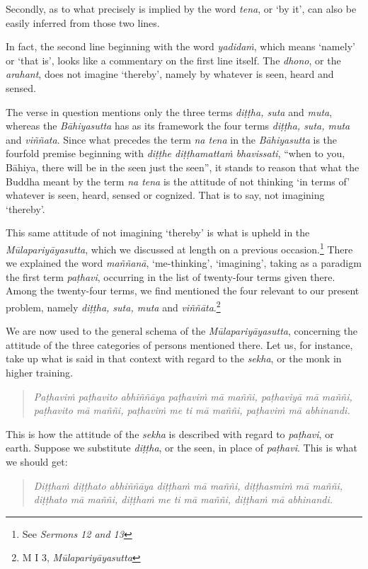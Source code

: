 Secondly, as to what precisely is implied by the word \emph{tena}, or `by it', can also be easily inferred from those two lines.

In fact, the second line beginning with the word \emph{yadidaṁ}, which means `namely' or `that is', looks like a commentary on the first line itself. The \emph{dhono}, or the \emph{arahant}, does not imagine `thereby', namely by whatever is seen, heard and sensed.

The verse in question mentions only the three terms \emph{diṭṭha, suta} and \emph{muta}, whereas the \emph{Bāhiyasutta} has as its framework the four terms \emph{diṭṭha, suta, muta} and \emph{viññata}. Since what precedes the term \emph{na tena} in the \emph{Bāhiyasutta} is the fourfold premise beginning with \emph{diṭṭhe diṭṭhamattaṁ bhavissati}, ``when to you, Bāhiya, there will be in the seen just the seen'', it stands to reason that what the Buddha meant by the term \emph{na tena} is the attitude of not thinking `in terms of' whatever is seen, heard, sensed or cognized. That is to say, not imagining `thereby'.

This same attitude of not imagining `thereby' is what is upheld in the \emph{Mūlapariyāyasutta}, which we discussed at length on a previous occasion.\footnote{See \emph{Sermons 12 and 13}} There we explained the word \emph{maññanā}, `me-thinking', `imagining', taking as a paradigm the first term \emph{paṭhavi}, occurring in the list of twenty-four terms given there. Among the twenty-four terms, we find mentioned the four relevant to our present problem, namely \emph{diṭṭha, suta, muta} and \emph{viññāta}.\footnote{M I 3, \emph{Mūlapariyāyasutta}}

We are now used to the general schema of the \emph{Mūlapariyāyasutta}, concerning the attitude of the three categories of persons mentioned there. Let us, for instance, take up what is said in that context with regard to the \emph{sekha}, or the monk in higher training.

\begin{quote}
\emph{Paṭhaviṁ paṭhavito abhiññāya paṭhaviṁ mā maññi, paṭhaviyā mā maññi, paṭhavito mā maññi, paṭhaviṁ me ti mā maññi, paṭhaviṁ mā abhinandi.}
\end{quote}

This is how the attitude of the \emph{sekha} is described with regard to \emph{paṭhavi}, or earth. Suppose we substitute \emph{diṭṭha}, or the seen, in place of \emph{paṭhavi}. This is what we should get:

\begin{quote}
\emph{Diṭṭhaṁ diṭṭhato abhiññāya diṭṭhaṁ mā maññi, diṭṭhasmiṁ mā maññi, diṭṭhato mā maññi, diṭṭhaṁ me ti mā maññi, diṭṭhaṁ mā abhinandi.}
\end{quote}


